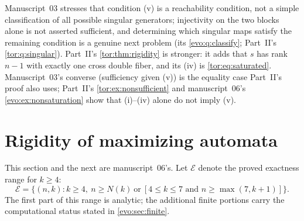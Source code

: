 \documentclass[11pt,a4paper]{article}
\numberwithin{equation}{section}
\theoremstyle{definition}
\theoremstyle{remark}
\begin{document}
Manuscript~03 stresses that condition (v) is a reachability condition, not a
simple classification of all possible singular generators; injectivity on the
two blocks alone is not asserted sufficient, and determining which singular
maps satisfy the remaining condition is a genuine next problem (its
\cref{evo:q:classify}; Part~II's \cref{tor:q:singular}). Part~II's
\cref{tor:thm:rigidity} is stronger: it adds that $s$ has rank $n-1$ with
exactly one cross double fiber, and its (iv) is \eqref{tor:eq:saturated}.
Manuscript~03's converse (sufficiency given (v)) is the equality case
Part~II's proof also uses; Part~II's \cref{tor:ex:nonsufficient} and
manuscript~06's \cref{evo:ex:nonsaturation} show that (i)--(iv) alone do not
imply (v).

\section{Rigidity of maximizing automata}\label{evo:sec:rigidity}

This section and the next are manuscript~06's. Let $\mathcal E$ denote the
proved exactness range for $k\ge4$:
\begin{equation}\label{evo:eq:exactrange}
\mathcal E=\{(n,k):k\ge4,
  \ n\ge N(k)\ \text{or}\
  [4\le k\le7\text{ and }n\ge\max(7,k+1)]\}.
\end{equation}
The first part of this range is analytic; the additional finite portions carry
the computational status stated in \cref{evo:sec:finite}.
\end{document}
